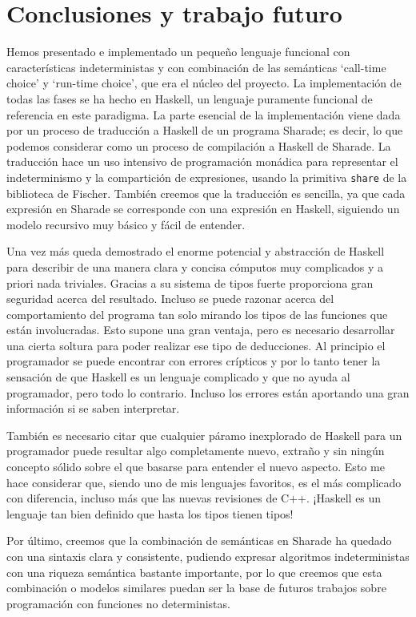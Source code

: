 \documentclass[class=article, crop=false]{standalone}
\begin{document}
\section{Conclusiones y trabajo futuro}
Hemos presentado e implementado un pequeño lenguaje funcional con características
indeterministas y con combinación de las semánticas `call-time choice' y `run-time choice',
que era el núcleo del proyecto. La implementación de todas las fases se ha hecho en Haskell,
un lenguaje puramente funcional de referencia en este paradigma. La parte esencial de la
implementación viene dada por un proceso de traducción a Haskell de un programa Sharade; es
decir, lo que podemos considerar como un proceso de compilación a Haskell de Sharade. La
traducción hace un uso intensivo de programación monádica para representar el indeterminismo
y la compartición de expresiones, usando la primitiva \verb`share` de la biblioteca de
Fischer. También creemos que la traducción es sencilla, ya que cada expresión en Sharade se
corresponde con una expresión en Haskell, siguiendo un modelo recursivo muy básico y fácil de
entender.

Una vez más queda demostrado el enorme potencial y abstracción de Haskell para describir de
una manera clara y concisa cómputos muy complicados y a priori nada triviales. Gracias a su
sistema de tipos fuerte proporciona gran seguridad acerca del resultado. Incluso se puede
razonar acerca del comportamiento del programa tan solo mirando los tipos de las funciones
que están involucradas. Esto supone una gran ventaja, pero es necesario desarrollar una
cierta soltura para poder realizar ese tipo de deducciones. Al principio el programador se
puede encontrar con errores crípticos y por lo tanto tener la sensación de que Haskell es un
lenguaje complicado y que no ayuda al programador, pero todo lo contrario. Incluso los
errores están aportando una gran información si se saben interpretar.

También es necesario citar que cualquier páramo inexplorado de Haskell para un programador
puede resultar algo completamente nuevo, extraño y sin ningún concepto sólido sobre el que
basarse para entender el nuevo aspecto. Esto me hace considerar que, siendo uno de mis
lenguajes favoritos, es el más complicado con diferencia, incluso más que las nuevas
revisiones de C++. ¡Haskell es un lenguaje tan bien definido que hasta los tipos tienen
tipos!

Por último, creemos que la combinación de semánticas en Sharade ha quedado con una sintaxis
clara y consistente, pudiendo expresar algoritmos indeterministas con una riqueza semántica
bastante importante, por lo que creemos que esta combinación o modelos similares puedan ser
la base de futuros trabajos sobre programación con funciones no deterministas.
\end{document}
